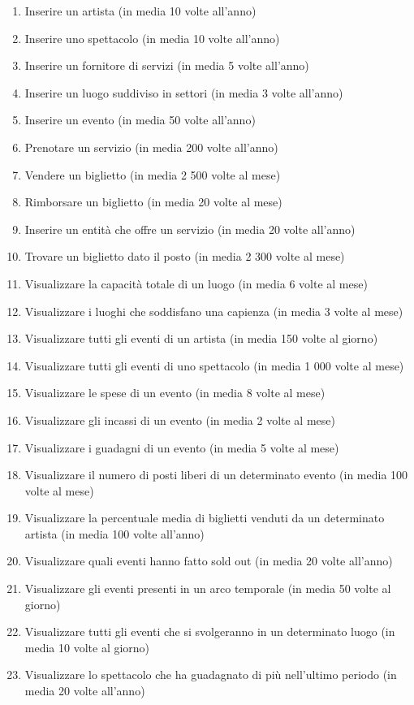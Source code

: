 \documentclass[a4paper,11pt]{article}
\begin{document}
\begin{enumerate}
    \item Inserire un artista (in media 10 volte all'anno)
    \item Inserire uno spettacolo (in media 10 volte all'anno)
    \item Inserire un fornitore di servizi (in media 5 volte all'anno)
    \item Inserire un luogo suddiviso in settori (in media 3 volte all'anno)
    \item Inserire un evento (in media 50 volte all'anno)
    \item Prenotare un servizio (in media 200 volte all'anno)
    \item Vendere un biglietto (in media 2 500 volte al mese)
    \item Rimborsare un biglietto (in media 20 volte al mese)
    \item Inserire un entità che offre un servizio (in media 20 volte all'anno)
    \item Trovare un biglietto dato il posto (in media 2 300 volte al mese)
    \item Visualizzare la capacità totale di un luogo (in media 6 volte al mese)
    \item Visualizzare i luoghi che soddisfano una capienza (in media 3 volte al mese)
    \item Visualizzare tutti gli eventi di un artista (in media 150 volte al giorno)
    \item Visualizzare tutti gli eventi di uno spettacolo (in media 1 000 volte al mese)
    \item Visualizzare le spese di un evento (in media 8 volte al mese)
    \item Visualizzare gli incassi di un evento (in media 2 volte al mese)
    \item Visualizzare i guadagni di un evento (in media 5 volte al mese)
    \item Visualizzare il numero di posti liberi di un determinato evento (in media 100 volte al mese)
    \item Visualizzare la percentuale media di biglietti venduti da un determinato artista (in media 100 volte all'anno)
    \item Visualizzare quali eventi hanno fatto sold out (in media 20 volte all'anno)
    \item Visualizzare gli eventi presenti in un arco temporale (in media 50 volte al giorno)
    \item Visualizzare tutti gli eventi che si svolgeranno in un determinato luogo (in media 10 volte al giorno)
    \item Visualizzare lo spettacolo che ha guadagnato di più nell'ultimo periodo (in media 20 volte all'anno)
\end{enumerate}
\end{document}
